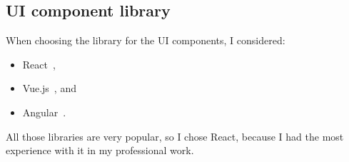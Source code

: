 \subsection{UI component library}\label{sec:ui-component-library}

When choosing the library for the UI components, I considered:

\begin{itemize}
      \item
            React~\cite{oshannessy_react_2022},
      \item
            Vue.js~\cite{you_vuejs_2022}, and
      \item
            Angular~\cite{kalpakas_angular_2022}.
\end{itemize}

All those libraries are very popular,
so I chose React,
because I had the most experience with it in my professional work.
